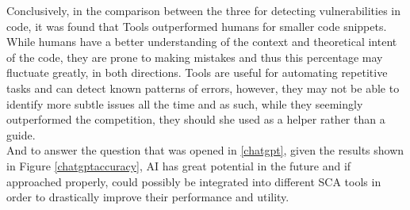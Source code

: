 \noindent Conclusively, in the comparison between the three for detecting vulnerabilities in code, it was found that Tools outperformed humans for smaller code snippets.
While humans have a better understanding of the context and theoretical intent of the code, they are prone to making mistakes and thus this percentage may fluctuate greatly, in both directions. Tools are useful for automating repetitive tasks and can detect known patterns of errors, however, they may not be able to identify more subtle issues all the time and as such, while they seemingly outperformed the competition, they should she used as a helper rather than a guide.\\


\noindent And to answer the question that was opened in \ref{chatgpt}, given the results shown in Figure \ref{chatgptaccuracy}, AI has great potential in the future and if approached properly, could possibly be integrated into different SCA tools in order to drastically improve their performance and utility.